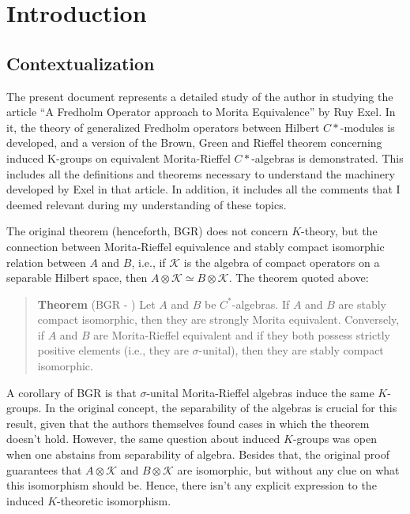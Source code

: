 \chapter*{Introduction}

\section*{Contextualization}

The present document represents a detailed study of the author in studying the article ``A Fredholm Operator approach to Morita Equivalence'' by Ruy Exel. In it, the theory of generalized Fredholm operators between Hilbert $C*$-modules is developed, and a version of the Brown, Green and Rieffel theorem concerning induced K-groups on equivalent Morita-Rieffel $C*$-algebras is demonstrated. This includes all the definitions and theorems necessary to understand the machinery developed by Exel in that article. In addition, it includes all the comments that I deemed relevant during my understanding of these topics.

The original theorem (henceforth, BGR) does not concern $K$-theory, but the connection between Morita-Rieffel equivalence and stably compact isomorphic relation between $A$ and $B$, i.e., if $\mathscr K$ is the algebra of compact operators on a separable Hilbert space, then $A\otimes \mathscr K \simeq B\otimes \mathscr K$. The theorem quoted above:
\begin{quote}
\textbf{Theorem} (BGR - \cite[Theorem 1.2]{brown1977morita}) 
Let $A$ and $B$ be $C^*$-algebras. If $A$ and $B$ are stably compact isomorphic, then they are strongly Morita equivalent. Conversely, if $A$ and $B$ are Morita-Rieffel equivalent and if they both possess strictly positive elements (i.e., they are $\sigma$-unital), then they are stably compact isomorphic.
\end{quote}
A corollary of BGR is that $\sigma$-unital Morita-Rieffel algebras induce the same $K$-groups. In the original concept, the separability of the algebras is crucial for this result, given that the authors themselves found cases in which the theorem doesn't hold. However, the same question about induced $K$-groups was open when one abstains from separability of algebra. Besides that, the original proof guarantees that $A\otimes \mathscr K$ and $B \otimes \mathscr K$ are isomorphic, but without any clue on what this isomorphism should be. Hence, there isn't any explicit expression to the induced $K$-theoretic isomorphism.

